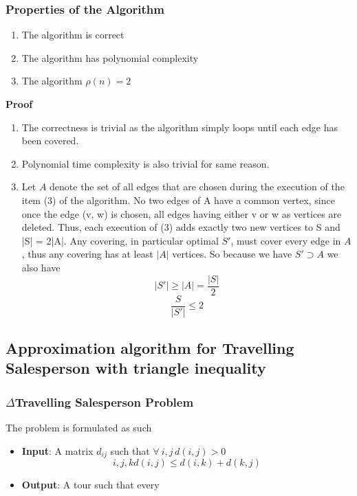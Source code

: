 \subsubsection{Properties of the Algorithm}
\begin{enumerate}
    \item The algorithm is correct
    \item The algorithm has polynomial complexity
    \item The algorithm $\rho(n) = 2$
\end{enumerate}
\textbf{Proof}
\begin{enumerate}
    \item
        The correctness is trivial
        as the algorithm simply loops until each edge has been covered.
    \item
        Polynomial time complexity is also trivial for same reason.
    \item
        Let $A$ denote the set of all edges that are chosen during the execution of the item (3) of the algorithm.
        No two edges of A have a common vertex, since once the edge (v, w) is chosen, all edges having either v or w as vertices are deleted.
        Thus, each execution of (3) adds exactly two new vertices to S and |S| = 2|A|.
        Any covering, in particular optimal $S\prime$, must cover every edge in $A$, thus any covering has at least $|A|$ vertices.
        So because we have $S\prime \supset A$ we also have
        $$|S\prime| \geq |A| = \frac{|S|}{2}$$
        $$\frac{S}{|S\prime|} \leq 2$$
\end{enumerate}

\subsection{Approximation algorithm for Travelling Salesperson with triangle inequality}
\subsubsection{$\Delta$Travelling Salesperson Problem}
The problem is formulated as such
\begin{itemize}
    \item \textbf{Input}:
        A matrix $d_{ij}$ such that $\forall\ i,j\, d(i,j) > 0$
        $$
        i,j,k d(i,j) \leq d(i,k) + d(k,j)
        $$
    \item \textbf{Output}:
        A tour such that every 
\end{itemize}

